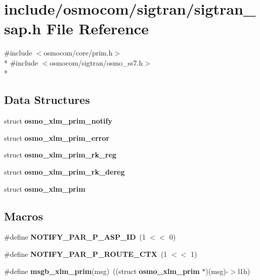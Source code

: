 \section{include/osmocom/sigtran/sigtran\+\_\+sap.h File Reference}
\label{sigtran__sap_8h}
{\ttfamily \#include $<$osmocom/core/prim.\+h$>$}\\*
{\ttfamily \#include $<$osmocom/sigtran/osmo\+\_\+ss7.\+h$>$}\\*
\subsection*{Data Structures}
\begin{DoxyCompactItemize}
\item 
struct {\bf osmo\+\_\+xlm\+\_\+prim\+\_\+notify}
\item 
struct {\bf osmo\+\_\+xlm\+\_\+prim\+\_\+error}
\item 
struct {\bf osmo\+\_\+xlm\+\_\+prim\+\_\+rk\+\_\+reg}
\item 
struct {\bf osmo\+\_\+xlm\+\_\+prim\+\_\+rk\+\_\+dereg}
\item 
struct {\bf osmo\+\_\+xlm\+\_\+prim}
\end{DoxyCompactItemize}
\subsection*{Macros}
\begin{DoxyCompactItemize}
\item 
\#define {\bf N\+O\+T\+I\+F\+Y\+\_\+\+P\+A\+R\+\_\+\+P\+\_\+\+A\+S\+P\+\_\+\+ID}~(1 $<$$<$ 0)
\item 
\#define {\bf N\+O\+T\+I\+F\+Y\+\_\+\+P\+A\+R\+\_\+\+P\+\_\+\+R\+O\+U\+T\+E\+\_\+\+C\+TX}~(1 $<$$<$ 1)
\item 
\#define {\bf msgb\+\_\+xlm\+\_\+prim}(msg)~((struct {\bf osmo\+\_\+xlm\+\_\+prim} $\ast$)(msg)-\/$>$l1h)
\end{DoxyCompactItemize}

